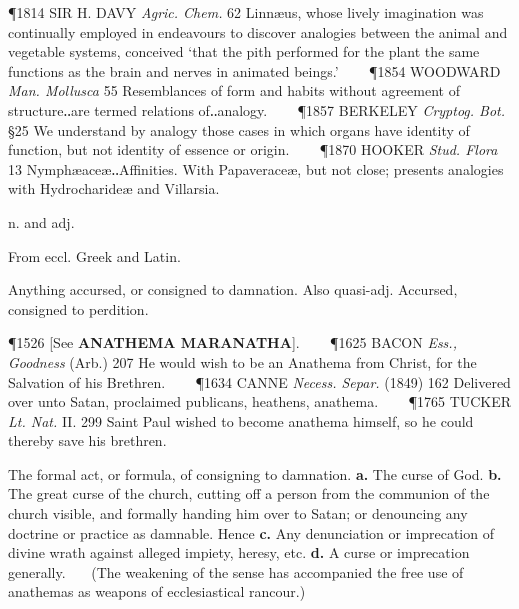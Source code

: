 \begin{description}[wide, labelwidth=!, labelindent=0pt]
\begin{myenumerate}
\P 1814 SIR H. DAVY \textit{Agric. Chem.} 62 Linnæus, whose lively imagination was continually employed in endeavours to discover analogies between the animal and vegetable systems, conceived ‘that the pith performed for the plant the same functions as the brain and nerves in animated beings.’    
\P 1854 WOODWARD \textit{Man. Mollusca} 55 Resemblances of form and habits without agreement of structure‥are termed relations of‥analogy.    
\P 1857 BERKELEY \textit{Cryptog. Bot.} §25 We understand by analogy those cases in which organs have identity of function, but not identity of essence or origin.    
\P 1870 HOOKER \textit{Stud. Flora} 13 Nymphæaceæ‥Affinities. With Papaveraceæ, but not close; presents analogies with Hydrocharideæ and Villarsia.
\end{myenumerate}

  n. and adj.

\noindent  {}

\vspace{-0.3cm}

\begin{myenumerate}
 From eccl. Greek and Latin. 

 Anything accursed, or consigned to damnation. Also quasi-adj. Accursed, consigned to perdition. 

\P 1526 [See \textbf{ANATHEMA MARANATHA}].    
\P 1625 BACON \textit{Ess., Goodness} (Arb.) 207 He would wish to be an Anathema from Christ, for the Salvation of his Brethren.    
\P 1634 CANNE \textit{Necess. Separ.} (1849) 162 Delivered over unto Satan, proclaimed publicans, heathens, anathema.    
\P 1765 TUCKER \textit{Lt. Nat.} II. 299 Saint Paul wished to become anathema himself, so he could thereby save his brethren.

 The formal act, or formula, of consigning to damnation. \textbf{a.} The curse of God. \textbf{b.} The great curse of the church, cutting off a person from the communion of the church visible, and formally handing him over to Satan; or denouncing any doctrine or practice as damnable. Hence \textbf{c.} Any denunciation or imprecation of divine wrath against alleged impiety, heresy, etc. \textbf{d.} A curse or imprecation generally.
   (The weakening of the sense has accompanied the free use of anathemas as weapons of ecclesiastical rancour.) 


\end{myenumerate}
\end{description}
